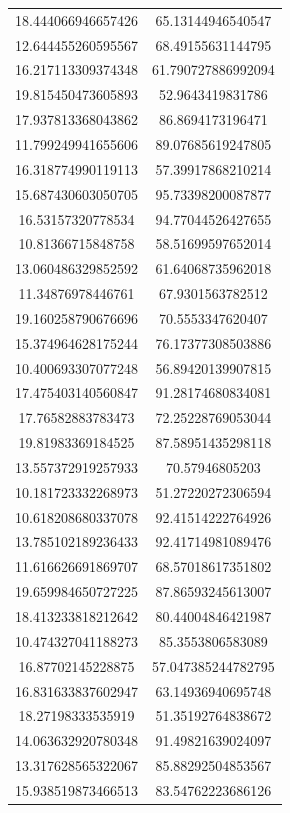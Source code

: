 \begin{table}
\begin{tabular}{cc}
18.444066946657426 & 65.13144946540547 \\
12.644455260595567 & 68.49155631144795 \\
16.217113309374348 & 61.790727886992094 \\
19.815450473605893 & 52.9643419831786 \\
17.937813368043862 & 86.8694173196471 \\
11.799249941655606 & 89.07685619247805 \\
16.318774990119113 & 57.39917868210214 \\
15.687430603050705 & 95.73398200087877 \\
16.53157320778534 & 94.77044526427655 \\
10.81366715848758 & 58.51699597652014 \\
13.060486329852592 & 61.64068735962018 \\
11.34876978446761 & 67.9301563782512 \\
19.160258790676696 & 70.5553347620407 \\
15.374964628175244 & 76.17377308503886 \\
10.400693307077248 & 56.89420139907815 \\
17.475403140560847 & 91.28174680834081 \\
17.76582883783473 & 72.25228769053044 \\
19.81983369184525 & 87.58951435298118 \\
13.557372919257933 & 70.57946805203 \\
10.181723332268973 & 51.27220272306594 \\
10.618208680337078 & 92.41514222764926 \\
13.785102189236433 & 92.41714981089476 \\
11.616626691869707 & 68.57018617351802 \\
19.659984650727225 & 87.86593245613007 \\
18.413233818212642 & 80.44004846421987 \\
10.474327041188273 & 85.3553806583089 \\
16.87702145228875 & 57.047385244782795 \\
16.831633837602947 & 63.14936940695748 \\
18.27198333535919 & 51.35192764838672 \\
14.063632920780348 & 91.49821639024097 \\
13.317628565322067 & 85.88292504853567 \\
15.938519873466513 & 83.54762223686126 \\

\end{tabular}
\end{table}
